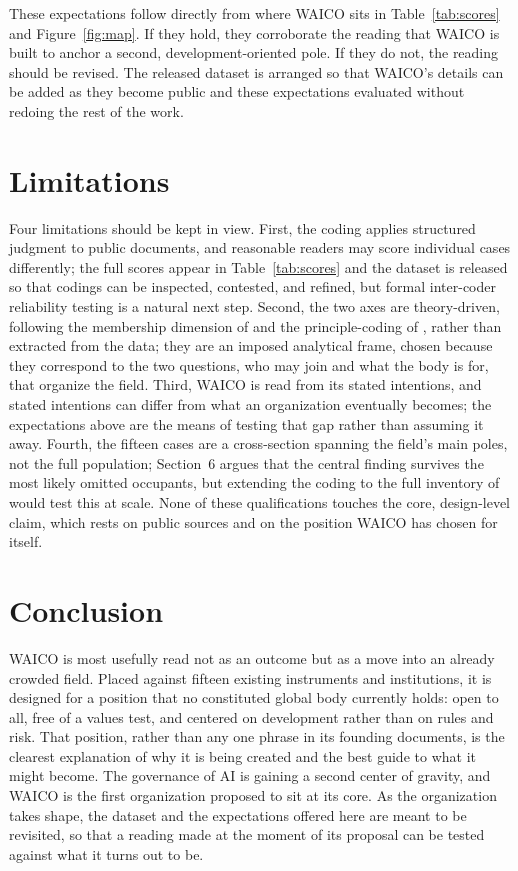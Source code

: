 \documentclass[11pt]{article}
\begin{document}
These expectations follow directly from where WAICO sits in Table~\ref{tab:scores} and Figure~\ref{fig:map}. If they hold, they corroborate the reading that WAICO is built to anchor a second, development-oriented pole. If they do not, the reading should be revised. The released dataset is arranged so that WAICO's details can be added as they become public and these expectations evaluated without redoing the rest of the work.

\section{Limitations}
Four limitations should be kept in view. First, the coding applies structured judgment to public documents, and reasonable readers may score individual cases differently; the full scores appear in Table~\ref{tab:scores} and the dataset is released so that codings can be inspected, contested, and refined, but formal inter-coder reliability testing is a natural next step. Second, the two axes are theory-driven, following the membership dimension of \citet{koremenos2001rational} and the principle-coding of \citet{jobin2019global}, rather than extracted from the data; they are an imposed analytical frame, chosen because they correspond to the two questions, who may join and what the body is for, that organize the field. Third, WAICO is read from its stated intentions, and stated intentions can differ from what an organization eventually becomes; the expectations above are the means of testing that gap rather than assuming it away. Fourth, the fifteen cases are a cross-section spanning the field's main poles, not the full population; Section~6 argues that the central finding survives the most likely omitted occupants, but extending the coding to the full inventory of \citet{geith2025emerging} would test this at scale. None of these qualifications touches the core, design-level claim, which rests on public sources and on the position WAICO has chosen for itself.

\section{Conclusion}
WAICO is most usefully read not as an outcome but as a move into an already crowded field. Placed against fifteen existing instruments and institutions, it is designed for a position that no constituted global body currently holds: open to all, free of a values test, and centered on development rather than on rules and risk. That position, rather than any one phrase in its founding documents, is the clearest explanation of why it is being created and the best guide to what it might become. The governance of AI is gaining a second center of gravity, and WAICO is the first organization proposed to sit at its core. As the organization takes shape, the dataset and the expectations offered here are meant to be revisited, so that a reading made at the moment of its proposal can be tested against what it turns out to be.
\end{document}
